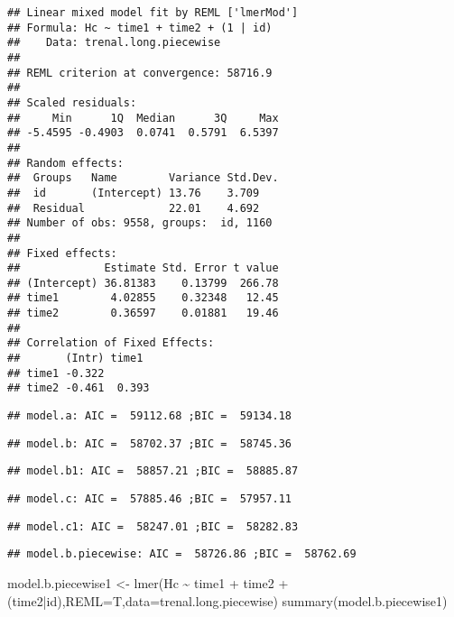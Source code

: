 \documentclass[
]{article}
\newenvironment{Shaded}{\begin{snugshade}}{\end{snugshade}}
\newcommand{\AttributeTok}[1]{\textcolor[rgb]{0.77,0.63,0.00}{#1}}
\newcommand{\FunctionTok}[1]{\textcolor[rgb]{0.00,0.00,0.00}{#1}}
\newcommand{\NormalTok}[1]{#1}
\newcommand{\OtherTok}[1]{\textcolor[rgb]{0.56,0.35,0.01}{#1}}
\newcommand{\SpecialCharTok}[1]{\textcolor[rgb]{0.00,0.00,0.00}{#1}}
\begin{document}
\begin{verbatim}
## Linear mixed model fit by REML ['lmerMod']
## Formula: Hc ~ time1 + time2 + (1 | id)
##    Data: trenal.long.piecewise
## 
## REML criterion at convergence: 58716.9
## 
## Scaled residuals: 
##     Min      1Q  Median      3Q     Max 
## -5.4595 -0.4903  0.0741  0.5791  6.5397 
## 
## Random effects:
##  Groups   Name        Variance Std.Dev.
##  id       (Intercept) 13.76    3.709   
##  Residual             22.01    4.692   
## Number of obs: 9558, groups:  id, 1160
## 
## Fixed effects:
##             Estimate Std. Error t value
## (Intercept) 36.81383    0.13799  266.78
## time1        4.02855    0.32348   12.45
## time2        0.36597    0.01881   19.46
## 
## Correlation of Fixed Effects:
##       (Intr) time1 
## time1 -0.322       
## time2 -0.461  0.393
\end{verbatim}

\begin{verbatim}
## model.a: AIC =  59112.68 ;BIC =  59134.18
\end{verbatim}

\begin{verbatim}
## model.b: AIC =  58702.37 ;BIC =  58745.36
\end{verbatim}

\begin{verbatim}
## model.b1: AIC =  58857.21 ;BIC =  58885.87
\end{verbatim}

\begin{verbatim}
## model.c: AIC =  57885.46 ;BIC =  57957.11
\end{verbatim}

\begin{verbatim}
## model.c1: AIC =  58247.01 ;BIC =  58282.83
\end{verbatim}

\begin{verbatim}
## model.b.piecewise: AIC =  58726.86 ;BIC =  58762.69
\end{verbatim}

\begin{Shaded}
\begin{Highlighting}[]
\NormalTok{model.b.piecewise1 }\OtherTok{\textless{}{-}} \FunctionTok{lmer}\NormalTok{(Hc }\SpecialCharTok{\textasciitilde{}}\NormalTok{ time1 }\SpecialCharTok{+}\NormalTok{ time2 }\SpecialCharTok{+}\NormalTok{ (time2}\SpecialCharTok{|}\NormalTok{id),}\AttributeTok{REML=}\NormalTok{T,}\AttributeTok{data=}\NormalTok{trenal.long.piecewise)}
\FunctionTok{summary}\NormalTok{(model.b.piecewise1)}
\end{Highlighting}
\end{Shaded}
\end{document}
